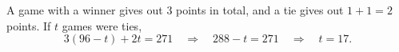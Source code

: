 A game with a winner gives out $3$ points in total, and a tie gives out $1+1=2$ points. If $t$ games were ties,
\[
3(96-t)+2t=271\quad\Longrightarrow\quad288-t=271\quad\Longrightarrow\quad t=\boxed{17}.
\]
